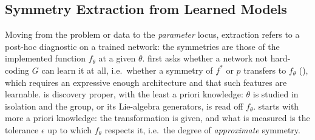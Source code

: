 \documentclass[mathematics,review,submit,moreauthors]{Definitions/mdpi}
\begin{document}
\subsection{Symmetry Extraction from Learned Models}\label{sec:sym-extract-model}
Moving from the problem or data to the \emph{parameter} locus, extraction refers to a post-hoc diagnostic on a trained network: the symmetries are those of the implemented function $f_\theta$ at a given $\theta$.
 first asks whether a network not hard-coding $G$ can learn it at all, i.e.\ whether a symmetry of $f^*$ or $p$ transfers to $f_\theta$ (), which requires an expressive enough architecture and that such features are learnable.
 is discovery proper, with the least a priori knowledge: $\theta$ is studied in isolation and the group, or its Lie-algebra generators, is read off $f_\theta$.
 starts with more a priori knowledge: the transformation is given, and what is measured is the tolerance $\epsilon$ up to which $f_\theta$ respects it, i.e.\ the degree of \emph{approximate} symmetry.
\end{document}
